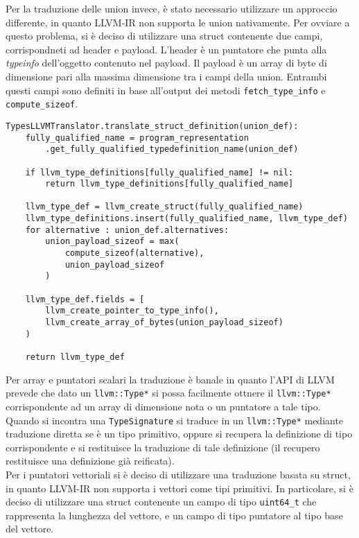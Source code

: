 \newpage

Per la traduzione delle union invece, è stato necessario utilizzare un approccio differente, in quanto LLVM-IR non supporta
le union nativamente. Per ovviare a questo problema, si è deciso di utilizzare una struct contenente due campi, corrispondneti
ad header e payload. L'header è un puntatore che punta alla \textit{typeinfo} dell'oggetto contenuto nel payload. Il payload
è un array di byte di dimensione pari alla massima dimensione tra i campi della union. Entrambi questi campi sono definiti in base
all'output dei metodi \texttt{fetch\_type\_info} e \texttt{compute\_sizeof}. \\

\vspace{0.5cm}
\begin{lstlisting}[frame=single]
TypesLLVMTranslator.translate_struct_definition(union_def):
    fully_qualified_name = program_representation
        .get_fully_qualified_typedefinition_name(union_def)

    if llvm_type_definitions[fully_qualified_name] != nil:
        return llvm_type_definitions[fully_qualified_name]
    
    llvm_type_def = llvm_create_struct(fully_qualified_name)
    llvm_type_definitions.insert(fully_qualified_name, llvm_type_def)
    for alternative : union_def.alternatives:
        union_payload_sizeof = max(
            compute_sizeof(alternative),
            union_payload_sizeof
        )

    llvm_type_def.fields = [
        llvm_create_pointer_to_type_info(),
        llvm_create_array_of_bytes(union_payload_sizeof)
    )
    
    return llvm_type_def
\end{lstlisting}
\vspace{0.5cm}

Per array e puntatori scalari la traduzione è banale in quanto l'API di LLVM prevede che dato un \texttt{llvm::Type*} si possa 
facilmente ottnere il \texttt{llvm::Type*} corrispondente ad un array di dimensione nota o un puntatore a tale tipo. Quando si incontra 
una \texttt{TypeSignature} si traduce in un \texttt{llvm::Type*} mediante traduzione diretta se è un tipo primitivo, oppure si recupera 
la definizione di tipo corrispondente e si restituisce la traduzione di tale definizione (il recupero restituisce una definizione già reificata). \\

Per i puntatori vettoriali si è deciso di utilizzare una traduzione basata su struct, in quanto LLVM-IR non supporta i vettori
come tipi primitivi. In particolare, si è deciso di utilizzare una struct contenente un campo di tipo \texttt{uint64\_t} che rappresenta
la lunghezza del vettore, e un campo di tipo puntatore al tipo base del vettore. \\

\newpage